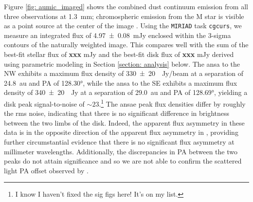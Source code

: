 \documentclass[12pt,oneside]{article}
\begin{document}
Figure \ref{fig: aumic_imaged} shows the combined dust continuum emission from all three observations at \SI{1.3}{mm}; chromospheric emission from the M star is visible as a point source at the center of the image \citep{cranmer13}. 
Using the \texttt{MIRIAD} task \texttt{cgcurs}, we measure an integrated flux of \SI{4.97 \pm 0.08}{\milli Jy} enclosed within the 3-sigma contours of the naturally weighted image.  This compares well with the sum of the best-fit stellar flux of \textbf{xxx} mJy and the best-fit disk flux of \textbf{xxx} mJy derived using parametric modeling in Section \ref{section: analysis} below.
The ansa to the NW exhibits a maximum flux density of \SI{330 \pm 20}{\mu Jy/beam} at a separation of \SI{24.8}{au} and PA of \ang{128.30}, while the ansa to the SE exhibits a maximum flux density of \SI{340 \pm 20}{\mu Jy} at a separation of \SI{29.0}{au} and PA of \ang{128.69}, yielding a disk peak signal-to-noise of $\sim23$.\footnote{I know I haven't fixed the sig figs here! It's on my list.} 
The ansae peak flux densities differ by roughly the rms noise, indicating that there is no significant difference in brightness between the two limbs of the disk.
Indeed, the apparent flux asymmetry in these data is in the opposite direction of the apparent flux asymmetry in \cite{macgregor13}, providing further circumstantial evidence that there is no significant flux asymmetry at millimeter wavelengths. 
Additionally, the discrepancies in PA between the two peaks do not attain significance and so we are not able to confirm the scattered light PA offset observed by \cite{boccaletti15}. 
\end{document}
